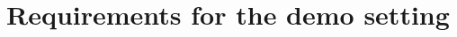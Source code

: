 \documentclass[sigconf]{aamas}
\begin{document}



\newpage

 



\newpage
\phantom{ }
\newpage

\section*{Requirements for the demo setting}




\end{document}
